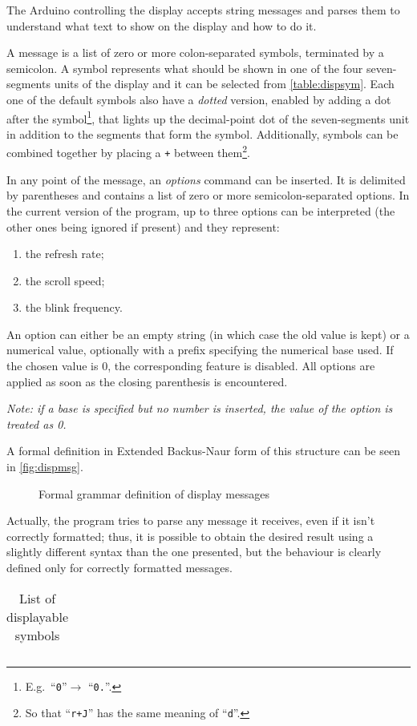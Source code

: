 The Arduino controlling the display accepts string messages and parses them to
understand what text to show on the display and how to do it.

A message is a list of zero or more colon-separated symbols, terminated by a
semicolon.
A symbol represents what should be shown in one of the four seven-segments units
of the display and it can be selected from \autoref{table:dispsym}.
Each one of the default symbols also have a \emph{dotted} version, enabled by
adding a dot after the symbol\footnote{E.g.\ ``\Verb+0+''$\rightarrow$
``\Verb+0.+''.}, that lights up the decimal-point dot of the seven-segments unit
in addition to the segments that form the symbol.
Additionally, symbols can be combined together by placing a \Verb|+| between
them\footnote{So that ``\Verb|r+J|'' has the same meaning of ``\Verb|d|''.}.

\beforelist* In any point of the message, an \emph{options} command can be
inserted.
It is delimited by parentheses and contains a list of zero or more
semicolon-separated options.
In the current version of the program, up to three options can be interpreted
(the other ones being ignored if present) and they represent:
\begin{enumerate}
  \item the refresh rate;
  \item the scroll speed;
  \item the blink frequency.
\end{enumerate}
\afterlist*
An option can either be an empty string (in which case the old value is kept)
or a numerical value, optionally with a prefix specifying the numerical base
used.
If the chosen value is $0$, the corresponding feature is disabled.
All options are applied as soon as the closing parenthesis is encountered.

\emph{Note: if a base is specified but no number is inserted, the value of the
option is treated as 0.}

A formal definition in Extended Backus-Naur form\cite{ebnf} of this structure
can be seen in \autoref{fig:dispmsg}.

\begin{figure}[h]


\caption{Formal grammar definition of display messages}
\label{fig:dispmsg}
\end{figure}

Actually, the program tries to parse any message it receives, even if it isn't
correctly formatted; thus, it is possible to obtain the desired result using a
slightly different syntax than the one presented, but the behaviour is clearly
defined only for correctly formatted messages.

\begin{table}[h]
\begin{multicols}{6}
\makeatletter\col@number\@ne\makeatother
\begin{longtable}{l|c}
  
\end{longtable}
\end{multicols}

\caption{List of displayable symbols}
\label{table:dispsym}
\end{table}
